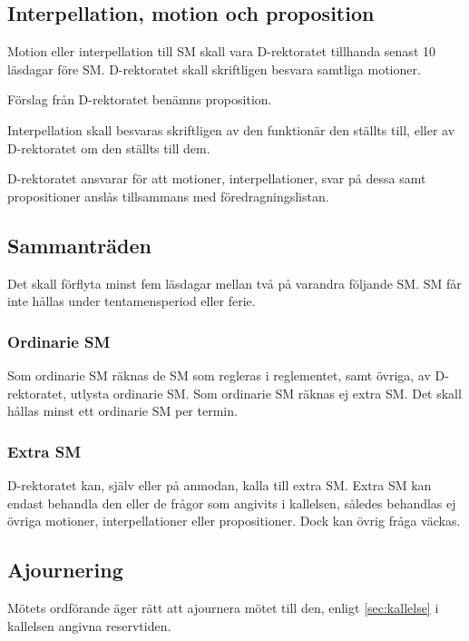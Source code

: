 \documentclass{dgovdoc}
\begin{document}
\subsection{Interpellation, motion och proposition}

Motion eller interpellation till SM skall vara D-rektoratet tillhanda senast 10
läsdagar före SM. D-rektoratet skall skriftligen besvara samtliga motioner.

Förslag från D-rektoratet benämns proposition.

Interpellation skall besvaras skriftligen av den funktionär den ställts till,
eller av D-rektoratet om den ställts till dem.

D-rektoratet ansvarar för att motioner, interpellationer, svar på dessa samt
propositioner anslås tillsammans med föredragningslistan.

\subsection{Sammanträden}

Det skall förflyta minst fem läsdagar mellan två på varandra följande SM. SM
får inte hållas under tentamensperiod eller ferie.

\subsubsection{Ordinarie SM}
\label{sec:ordinarie_sm}

Som ordinarie SM räknas de SM som regleras i reglementet, samt övriga, av
D-rektoratet, utlysta ordinarie SM. Som ordinarie SM räknas ej extra SM. Det
skall hållas minst ett ordinarie SM per termin.

\subsubsection{Extra SM}

D-rektoratet kan, själv eller på anmodan, kalla till extra SM. Extra SM kan
endast behandla den eller de frågor som angivits i kallelsen, således behandlas
ej övriga motioner, interpellationer eller propositioner. Dock kan övrig fråga
väckas.

\subsection{Ajournering}
\label{sec:ajournering}

Mötets ordförande äger rätt att ajournera mötet till den, enligt 
\ref{sec:kallelse} i kallelsen angivna reservtiden.
\end{document}
